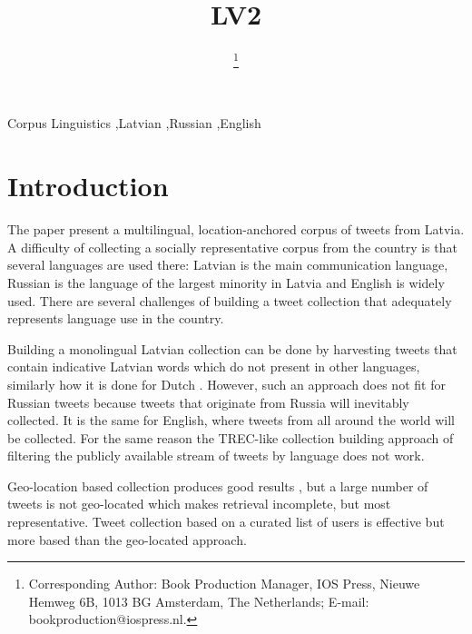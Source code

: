 \documentclass{IOS-Book-Article}
\begin{document}
\begin{frontmatter}              %

\title{LV2}

\author[A]{ %
\thanks{Corresponding Author: Book Production Manager, IOS Press, Nieuwe Hemweg 6B,
1013 BG Amsterdam, The Netherlands; E-mail:
bookproduction@iospress.nl.}}


\address[A]{Confidential Review Copy, Do Not Distribute}

%

\begin{keyword}
Corpus Linguistics \sep Latvian \sep Russian \sep English
\end{keyword}
\end{frontmatter}

\thispagestyle{empty}
\pagestyle{empty}

\section*{Introduction}

The paper present a multilingual, location-anchored corpus of tweets from Latvia. A difficulty of collecting a socially representative corpus from the country is that several languages are used there: Latvian is the main communication language, Russian is the language of the largest minority in Latvia and English is widely used. There are several challenges of building a tweet collection that adequately represents language use in the country.

Building a monolingual Latvian collection can be done by harvesting tweets that contain indicative Latvian words which do not present in other languages, similarly how it is done for Dutch \cite{sang2013}. However, such an approach does not fit for Russian tweets because tweets that originate from Russia will inevitably collected. It is the same for English, where tweets from all around the world will be collected. For the same reason the TREC-like collection building approach  of filtering the publicly available stream of tweets by language does not work.

Geo-location based collection produces good results \cite{milajevs:2017:BUCC}, but a large number of tweets is not geo-located which makes retrieval incomplete, but most representative.
%
Tweet collection based on a curated list of users \cite{SANVICENTE16.465} is effective but more based than the geo-located approach.




\end{document}
